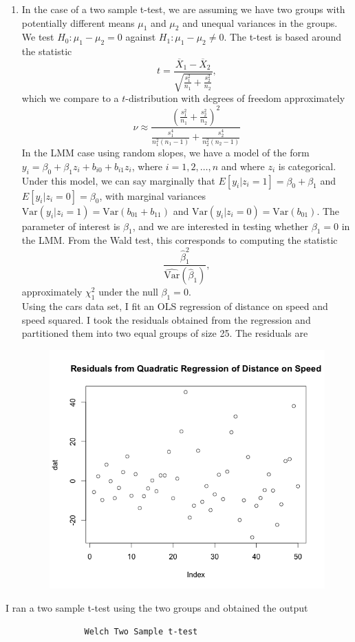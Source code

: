 \documentclass[11pt]{article}
\newcommand{\Var}{\mathrm{Var}}
\begin{document}
\begin{enumerate}
\begin{enumerate}
			\item In the case of a two sample t-test, we are assuming we have two groups with potentially different means $\mu_1$ and $\mu_2$ and unequal variances in the groups. We test $H_0:\mu_1-\mu_2=0$ against $H_1: \mu_1-\mu_2\neq 0$. The t-test is based around the statistic
			\[
				t = \frac{\overline{X}_1 - \overline{X}_2}{\sqrt{\frac{s_1^2}{n_1} + \frac{s_2^2}{n_2}}},
			\]	
			which we compare to a $t$-distribution with degrees of freedom approximately
			\[
				\nu \approx \frac{\left(\frac{s_1^2}{n_1} + \frac{s_2^2}{n_2} \right)^2}{\frac{s_1^4}{n_1^2(n_1-1)} + \frac{s_2^4}{n_2^2(n_2-1)}}
			\]
			In the LMM case using random slopes, we have a model of the form $y_i = \beta_0 + \beta_1 z_i + b_{i0} + b_{i1} z_i$, where $i=1,2,\dotsc,n$ and where $z_i$ is categorical. Under this model, we can say marginally that $E[y_i | z_i = 1] = \beta_0+\beta_1$ and $E[y_i | z_i = 0] = \beta_0$, with marginal variances $\Var(y_i | z_i = 1) = \Var(b_{01}+b_{11})$ and $\Var(y_i | z_i = 0) = \Var(b_{01})$. The parameter of interest is $\beta_1$, and we are interested in testing whether $\beta_1=0$ in the LMM. From the Wald test, this corresponds to computing the statistic
			\[
				\frac{\widehat{\beta}_1^2}{\widehat{\Var}(\widehat{\beta}_1)},
			\]
			approximately $\chi^2_1$ under the null $\beta_1=0$. \\
			Using the cars data set, I fit an OLS regression of distance on speed and speed squared. I took the residuals obtained from the regression and partitioned them into two equal groups of size 25. The residuals are
			\begin{figure}[H]
				\centering
				\includegraphics[scale=0.5]{Rplot1}
			\end{figure}
		\end{enumerate}
		I ran a two sample t-test using the two groups and obtained the output 
		\begin{verbatim}
				Welch Two Sample t-test


\end{verbatim}
\end{enumerate}
\end{document}
